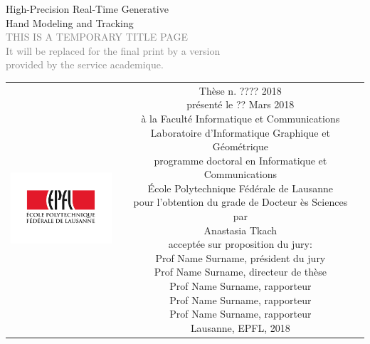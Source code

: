 \begin{titlepage}
\begin{center}
\sffamily


\null\vspace{2cm}
{\huge High-Precision Real-Time Generative \\[12pt] Hand Modeling and Tracking } \\[24pt] 
\textcolor{gray}{\small{THIS IS A TEMPORARY TITLE PAGE \\ It will be replaced for the final print by a version \\ provided by the service academique.}}
    
\vfill

\begin{tabular} {cc}
\parbox{0.3\textwidth}{\includegraphics[width=4cm]{images/epfl}}
&
\parbox{0.7\textwidth}{%
	Thèse n. ???? 2018\\
	présenté le ?? Mars 2018\\
	à la Faculté Informatique et Communications \\
	Laboratoire d’Informatique Graphique et Géométrique \\
	programme doctoral en Informatique et Communications \\
	École Polytechnique Fédérale de Lausanne\\[6pt]
	pour l'obtention du grade de Docteur ès Sciences\\
	par\\ [4pt]
	\null \hspace{3em} Anastasia Tkach\\[9pt]
%
\small
acceptée sur proposition du jury:\\[4pt]
%
    Prof Name Surname, président du jury\\
    Prof Name Surname, directeur de thèse\\
    Prof Name Surname, rapporteur\\
    Prof Name Surname, rapporteur\\
    Prof Name Surname, rapporteur\\[12pt]
%
Lausanne, EPFL, 2018}
\end{tabular}
\end{center}
\vspace{2cm}
\end{titlepage}



